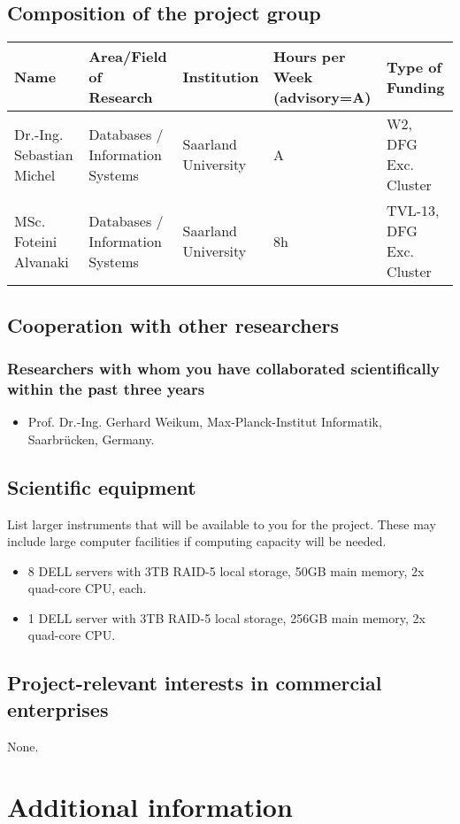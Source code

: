 \subsection{Composition of the project group}
\small
\begin{tabular}{|p{}|p{}|p{}|p{}|p{}|} \hline 
{\bf Name} & {\bf Area/Field of \newline Research} & {\bf Institution} & {\bf Hours per Week \newline (advisory=A)} & {\bf Type of \newline Funding}\\ \hline \hline
Dr.-Ing. Sebastian Michel & Databases / Information Systems & Saarland University  & A & W2, DFG Exc. Cluster \\ \hline
MSc. Foteini Alvanaki & Databases / Information Systems & Saarland University  & 8h & TVL-13, DFG Exc. Cluster\\ \hline
\end{tabular}

\subsection{Cooperation with other researchers}

	\subsubsection{Researchers with whom you have collaborated scientifically within the past three years}

	\begin{itemize}

		\item Prof. Dr.-Ing. Gerhard Weikum, Max-Planck-Institut Informatik, Saarbr{\"u}cken, Germany.
	\end{itemize}

\subsection{Scientific equipment}
		List larger instruments that will be available to you for the project. 
		These may include large computer facilities if computing capacity will be needed. 

\begin{itemize}
\item 8 DELL servers with 3TB RAID-5 local storage, 50GB main memory, 2x quad-core CPU, each.
\item 1 DELL server with 3TB RAID-5 local storage, 256GB main memory,  2x quad-core CPU.
\end{itemize}


\subsection{Project-relevant interests in commercial enterprises}

None.

\section{Additional information}

